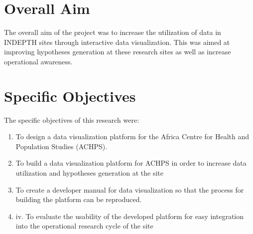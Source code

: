 \section{Overall Aim}\label{aim}

The overall aim of the project was to increase the utilization of data in INDEPTH sites through interactive data visualization. This was aimed at improving hypotheses generation at these research sites as well as increase operational awareness.

\section{Specific Objectives}\label{objectives}
The specific objectives of this research were:

\begin{enumerate}
 \item To design a data visualization platform for the Africa Centre for Health and Population Studies (ACHPS).
 \item To build a data visualization platform for ACHPS in order to increase data utilization and hypotheses generation at the site
 \item To create a developer manual for data visualization so that the process for building the platform can be reproduced.
 \item iv. To evaluate the usability of the developed platform for easy integration into the operational research cycle of the site
\end{enumerate}